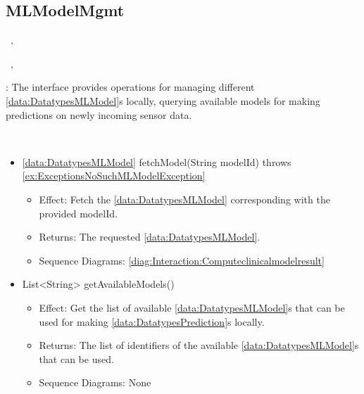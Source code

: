   \subsection{MLModelMgmt}\label{int:InterfacesMLModelMgmt}
    \begin{description}
      \item[Provided by:] \iconcomponent{}~, \iconcomponent{}~
      \item[Required by:] \iconcomponent{}~, \iconcomponent{}~ 
           \item[Description]: The interface provides operations for managing different \ref{data:DatatypesMLModel}s locally, querying available models for making predictions on newly incoming sensor data.
      \item[Operations:] ~
    \begin{itemize}[noitemsep,nolistsep,leftmargin=-.25cm]
      \item \textsf{\ref{data:DatatypesMLModel} fetchModel(String modelId) throws \ref{ex:ExceptionsNoSuchMLModelException}}
        \begin{itemize}[noitemsep,nolistsep]
           \item Effect: Fetch the \ref{data:DatatypesMLModel} corresponding with the provided modelId. 
           \item Returns: The requested \ref{data:DatatypesMLModel}.
           \item Sequence Diagrams: \cref{diag:Interaction:Computeclinicalmodelresult}
        \end{itemize}
      \item \textsf{List\textless{}String\textgreater{} getAvailableModels()}
        \begin{itemize}[noitemsep,nolistsep]
           \item Effect: Get the list of available \ref{data:DatatypesMLModel}s that can be used for making \ref{data:DatatypesPrediction}s locally. 
           \item Returns: The list of identifiers of the available \ref{data:DatatypesMLModel}s that can be used.
           \item Sequence Diagrams: None
        \end{itemize}

\end{itemize}
\end{description}
